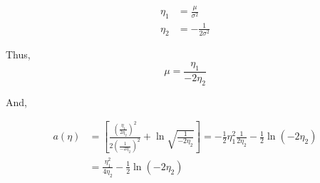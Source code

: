 \documentclass{article}
\begin{document}
\begin{align*}
  \eta_1 & =\frac{\mu}{\sigma^2} \\
  \eta_2 & =-\frac{1}{2\sigma^2}
\end{align*}

Thus,
$$
  \mu=\frac{\eta_1}{-2\eta_2}
$$

And,

\begin{align*}
  a(\eta) & =\left[\frac{\left(\frac{\eta_1}{2\eta_2}\right)^2}{2\left(\frac{1}{-2\eta_2}\right)^2}+\ln\sqrt{\frac{1}{-2\eta_2}}\right]=-\frac{1}{2}\eta_1^2\frac{1}{2\eta_2}-\frac{1}{2}\ln\left(-2\eta_2\right) \\
          & =\frac{\eta_1^2}{4\eta_2}-\frac{1}{2}\ln\left(-2\eta_2\right)                                                                                                                                         \\
\end{align*}
\end{document}
